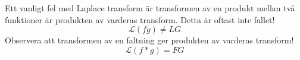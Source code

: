 \documentclass{article}
\begin{document}
Ett vanligt fel med Laplace transform är transformen av en produkt mellan två funktioner är produkten av varderas transform. 
Detta är oftast inte fallet! 
$$\mathcal{L} (f g) \neq L G $$
Observera att transformen av en faltning ger produkten av varderas transform!
$$\mathcal{L} (f*g) = F G $$ %
\appendix
\end{document}
